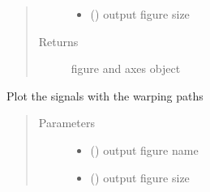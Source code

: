 \documentclass[letterpaper,10pt,english]{sphinxmanual}
\begin{document}
\begin{fulllineitems}
\begin{fulllineitems}
\begin{quote}
\begin{description}
\begin{itemize}
\item {} 
\sphinxAtStartPar
{} () \textendash{} output figure size

\end{itemize}

\item[{Returns}] \leavevmode
\sphinxAtStartPar
figure and axes object

\end{description}\end{quote}

\end{fulllineitems}


\begin{fulllineitems}
\label{\detokenize{modules/dtw_analysis:dtwhaclustering.dtw_analysis.dtw_signal_pairs.plot_warping_path}}
\sphinxAtStartPar
Plot the signals with the warping paths
\begin{quote}\begin{description}
\item[{Parameters}] \leavevmode\begin{itemize}
\item {} 
\sphinxAtStartPar
{} () \textendash{} output figure name

\item {} 
\sphinxAtStartPar
{} () \textendash{} output figure size

\end{itemize}

\end{description}\end{quote}

\end{fulllineitems}


\end{fulllineitems}
\end{document}
